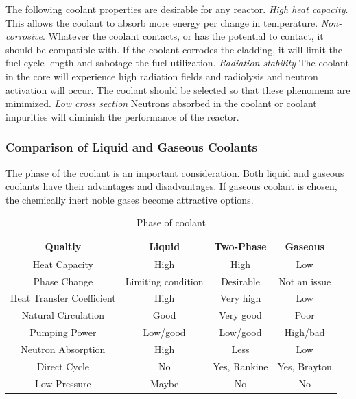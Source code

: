 The following coolant properties are desirable for any reactor. \emph{High heat capacity}. This allows the coolant to absorb more energy per change in temperature. \emph{Non-corrosive}. Whatever the coolant contacts, or has the potential to contact, it should be compatible with. If the coolant corrodes the cladding, it will limit the fuel cycle length and sabotage the fuel utilization. \emph{Radiation stability} The coolant in the core will experience high radiation fields and radiolysis and neutron activation will occur. The coolant should be selected so that these phenomena are minimized. \emph{Low cross section} Neutrons absorbed in the coolant or coolant impurities will diminish the performance of the reactor.%


\subsubsection{Comparison of Liquid and Gaseous Coolants}
The phase of the coolant is an important consideration. Both liquid and gaseous coolants have their advantages and disadvantages.
If gaseous coolant is chosen, the chemically inert noble gases become attractive options.

\begin{table}[!ht]
\begin{tabular}{c|c|c|c}
  Qualtiy & Liquid & Two-Phase & Gaseous \\
  \hline
  Heat Capacity & High & High & Low \\
  Phase Change & Limiting condition & Desirable & Not an issue \\
  Heat Transfer Coefficient & High & Very high & Low \\
  Natural Circulation & Good & Very good & Poor \\
  Pumping Power & Low/good & Low/good & High/bad\\
  Neutron Absorption & High & Less & Low\\
  Direct Cycle & No & Yes, Rankine & Yes, Brayton\\
  Low Pressure & Maybe & No & No\\
  \hline
\end{tabular}
\caption{Phase of coolant}
\end{table}



